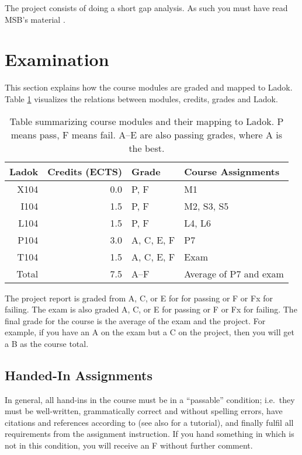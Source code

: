 \documentclass[a4paper,logo]{miunart}
\begin{document}
The project consists of doing a short gap analysis.
As such you must have read MSB's material \cite{%
  MSB2011itm,MSB2011sle,MSB2011p,MSB2011v,MSB2011r,%
  MSB2011gap,MSB2011vs,MSB2011us,MSB2011upo,%
	MSB2011pg,MSB2011koa,MSB2011i,MSB2011o,MSB2011g,%
	MSB2011lg,MSB2011ulo,MSB2011kf,MSB2011fa%
}.


\section{Examination}
\label{sec:exam}
This section explains how the course modules are graded and mapped to Ladok.
Table \ref{tbl:ladok} visualizes the relations between modules, credits, grades 
and Ladok.

\begin{table}
  \centering
  \begin{tabular}{rrll}
    Ladok & Credits (ECTS)  & Grade       & Course Assignments\\
    \toprule
    X104  & 0.0             & P, F        & M1\\
    I104  & 1.5             & P, F        & M2, S3, S5\\
    L104  & 1.5             & P, F        & L4, L6\\
    P104  & 3.0             & A, C, E, F  & P7\\
    T104  & 1.5             & A, C, E, F  & Exam\\
    \midrule
    Total & 7.5             & A--F        & Average of P7 and exam\\
    \bottomrule
  \end{tabular}
  \caption{%
    Table summarizing course modules and their mapping to Ladok.
    P means pass, F means fail.
    A--E are also passing grades, where A is the best.
  }
  \label{tbl:ladok}
\end{table}

The project report is graded from A, C, or E for for passing or F or Fx for 
failing.
The exam is also graded A, C, or E for passing or F or Fx for failing.
The final grade for the course is the average of the exam and the project.
For example, if you have an A on the exam but a C on the project, then you will 
get a B as the course total.

\subsection{Handed-In Assignments}

In general, all hand-ins in the course must be in a \enquote{passable} 
condition; i.e.~they must be well-written, grammatically correct and without 
spelling errors, have citations and references according to \cite{IEEEcitation} 
(see also \cite{PurdueCitation} for a tutorial), and finally fulfil all 
requirements from the assignment instruction.
If you hand something in which is not in this condition, you will receive an 
F without further comment.
\end{document}
